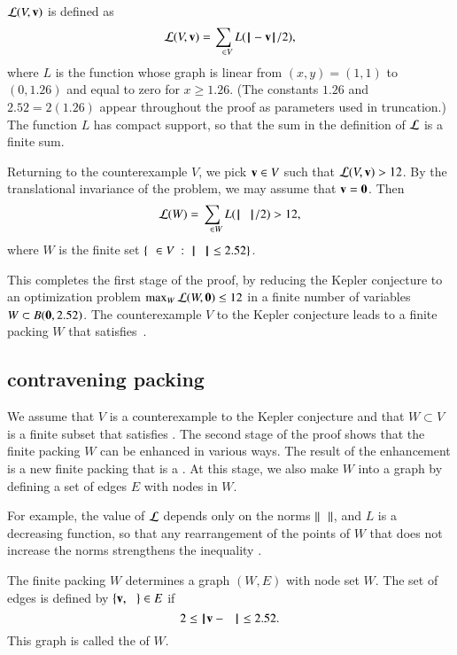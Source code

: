 ${\mathcal L}(V,{\mathbf v})$ is defined as
\[
\CalL(V,\v) = \sum_{\w\in V} L(\norm{\w}{\v}/2),
\]
where $L$ is the function whose graph is linear from $(x,y)=(1,1)$ to $(0,1.26)$ and equal
to zero for $x\ge 1.26$.  (The constants $1.26$ and $2.52=2(1.26)$ appear throughout the
proof as parameters used in truncation.)   
The function $L$ has compact support, so that the sum in the
definition of ${\mathcal L}$ is a finite sum.

Returning to the counterexample $V$, we pick ${\mathbf v}\in V$ such that
${\mathcal L}(V,{\mathbf v})>12$.  By the translational invariance of the problem, we
may assume that ${\mathbf v}={\mathbf 0}$.  Then
\begin{equation}\label{eqn:LW}
\CalL(W) = \sum_{\w\in W} L(\normo{\w}/2)  > 12,
\end{equation}
where $W$ is the finite set  $\{\w\in V\mid \normo{\w} \le 2.52\}$.

This completes the first stage of the proof, by reducing the Kepler conjecture to an optimization
problem $\max_W {\mathcal L}(W,{\mathbf 0}) \le 12$ in a finite number of variables $W\subset B({\mathbf 0},2.52)$.
The counterexample $V$ to the Kepler conjecture leads to a finite packing $W$
that satisfies~.

\subsection{contravening packing}

We assume that $V$ is a counterexample to the Kepler conjecture and that $W\subset V$
is a finite subset that satisfies .
The second stage of the proof shows that the 
finite packing $W$ can be enhanced in various ways.  The result of the enhancement is
a new finite packing that is a .  At this stage, we also
make $W$ into a graph by defining a set of edges $E$ with nodes in $W$.

For example, the value of ${\mathcal L}$
depends only on the norms $\normo{\w}$, and $L$ is a decreasing
function, so that any rearrangement of the points of $W$ that does not
increase the norms strengthens the inequality .

The finite packing $W$ determines a graph $(W,E)$ with node set $W$.  The set
of edges is defined by $\{{\mathbf v},\hskip0.65em\}\in E$ if 
\[2\le\norm{\v}{\w}\le 2.52.\] This graph is called the  of $W$.

